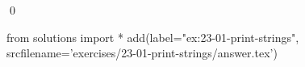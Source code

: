 
\begin{ex}
  \label{ex:23-01-print-strings}
  
  \qed
\end{ex}
\begin{python0}
from solutions import *
add(label="ex:23-01-print-strings",
    srcfilename='exercises/23-01-print-strings/answer.tex')
\end{python0}
